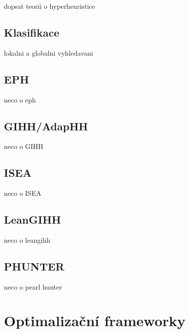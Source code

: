 dopsat teorii o hyperheuristice

\subsection{Klasifikace}
lokalni a globalni vyhledavani


\subsection{EPH}
neco o eph

\subsection{GIHH/AdapHH}
neco o GIHH

\subsection{ISEA}
neco o ISEA

\subsection{LeanGIHH}
neco o leangihh\cite{adriaensen2016case}

\subsection{PHUNTER}
neco o pearl hunter


\section{Optimalizační frameworky}

